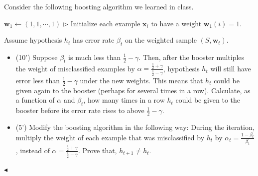 ﻿\documentclass[11pt]{article}
\newenvironment{problem}[2][Problem]{\begin{trivlist}
\item[\hskip \labelsep {\bfseries #1}\hskip \labelsep {\bfseries #2.}]}{\hfill$\blacktriangleleft$\end{trivlist}}
\begin{document}
\begin{problem}{4 (15')} 
Consider the following boosting algorithm we learned in class. 

\begin{algorithm}[H]
    \caption{Boosting algorithm}

    $\bm w_1\gets (1,1,\cdots,1)$ \hfill{$\triangleright$ Initialize each example $\bm x_i$ to have a weight $\bm w_{1}(i)=1$.}


\end{algorithm}

Assume hypothesis $h_t$ has error rate $\beta_t$ on the weighted sample $(S,\bm w_t)$.
\begin{itemize}
    \item [(1)] (10') Suppose $\beta_t$ is much less than $\frac12-\gamma$. Then, after the booster multiples the weight of misclassified examples by $\alpha=\frac{\frac{1}{2}+\gamma}{\frac{1}{2}-\gamma}$, hypothesis $h_t$ will still have error less than $\frac12-\gamma$ under the new weights. This means that $h_t$ could be given again to the booster (perhaps for several times in a row). Calculate, as a function of $\alpha$ and $\beta_t$, how many times in a row $h_t$ could be given to the booster before its error rate rises to above $\frac12-\gamma$. 
    \item [(2)] (5') Modify the boosting algorithm in the following way: During the iteration, multiply the weight of each example that was misclassified by $h_t$ by $\alpha_t=\frac{1-\beta_t}{\beta_t}$, instead of $\alpha=\frac{\frac{1}{2}+\gamma}{\frac{1}{2}-\gamma}$. Prove that, $h_{t+1}\ne h_t$.
\end{itemize}
\end{problem}
\end{document}
